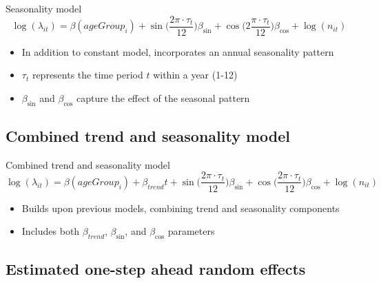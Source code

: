 \documentclass[aspectratio=169]{beamer}
\begin{document}
\begin{frame}{Seasonality model}
\begin{equation}
\log(\lambda_{it})=\beta(ageGroup_{i})+ \sin \bigg(\frac{2\pi\cdot \tau_t}{12}\bigg) \beta_{\sin} + \cos \bigg(2\frac{\pi\cdot \tau_t}{12}\bigg) \beta_{\cos} + \log(n_{it})
\end{equation}

\begin{itemize}
  \item In addition to constant model, incorporates an annual seasonality pattern
  \item $\tau_t$ represents the time period $t$ within a year (1-12)
  \item $\beta_{\sin}$ and $\beta_{\cos}$ capture the effect of the seasonal pattern
\end{itemize}
\end{frame}

\hypertarget{combined-trend-and-seasonality-model}{%
\subsection{Combined trend and seasonality
model}\label{combined-trend-and-seasonality-model}}

\begin{frame}{Combined trend and seasonality model}
\begin{equation}\label{eq:AgegroupTrendSeasonality}
  \log(\lambda_{it})=\beta(ageGroup_{i}) + \beta_{trend} t + \sin \bigg(\frac{2\pi\cdot \tau_t}{12}\bigg) \beta_{\sin} + \cos \bigg(\frac{2\pi\cdot \tau_t}{12}\bigg)\beta_{\cos} + \log(n_{it})
\end{equation}

\begin{itemize}
  \item Builds upon previous models, combining trend and seasonality components
  \item Includes both $\beta_{trend}$, $\beta_{\sin}$, and $\beta_{\cos}$ parameters
\end{itemize}
\end{frame}

\hypertarget{estimated-one-step-ahead-random-effects}{%
\subsection{Estimated one-step ahead random
effects}\label{estimated-one-step-ahead-random-effects}}
\end{document}
